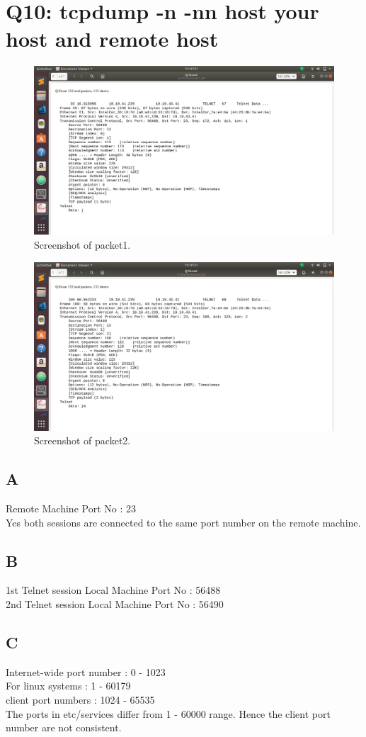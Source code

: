 \documentclass{article}
\begin{document}
\section{Q10: tcpdump -n -nn host your host and remote host}
\begin{figure}[H]
 \centering
 \includegraphics[width=1.0\textwidth]{../Q10/packet1.png}
 \caption{\label{fig:PACKET1}Screenshot of packet1.}
 \end{figure}
 \begin{figure}[H]
 \centering
 \includegraphics[width=1.0\textwidth]{../Q10/packet2.png}
 \caption{\label{fig:PACKET2}Screenshot of packet2.}
 \end{figure}
\subsection{A}
Remote Machine Port No : 23 \\
Yes both sessions are connected to the same port number on the remote machine.
\subsection{B}
1st Telnet session Local Machine Port No : 56488 \\ 
2nd Telnet session Local Machine Port No : 56490
\subsection{C}
Internet-wide port number : 0 - 1023 \\
For linux systems         :  1 - 60179 \\
client port numbers       : 1024 - 65535 \\
The ports in etc/services differ from 1 - 60000 range. Hence the client port number are not consistent.
\end{document}
